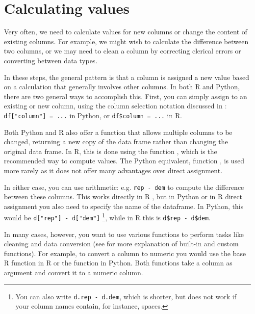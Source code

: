 \section{Calculating values}
\label{sec:calculate}

Very often, we need to calculate values for new columns or change the content of existing columns.
For example, we might wish to calculate the difference between two columns,
or we may need to clean a column by correcting clerical errors or converting between data types.

In these steps, the general pattern is that a column is assigned a new value based on
a calculation that generally involves other columns.
In both R and Python, there are two general ways to accomplish this.
First, you can simply assign to an existing or new column,
using the column selection notation discussed in :
\verb+df["column"] = ...+ in Python, or \verb+df$column = ...+ in R.

Both Python and R also offer a function that allows multiple columns to be changed,
returning a new copy of the data frame rather than changing the original data frame.
In R, this is done using the  function , which is the recommended way to compute values.
The Python equivalent,  function , is used more rarely as it does not offer many advantages over direct assignment.

In either case, you can use arithmetic: e.g. \verb|rep - dem| to compute the difference between these columns.
This works directly in R ,
but in Python or in R direct assignment you also need to specify the name of the dataframe.
In Python, this would be \verb+d["rep"] - d["dem"]+ \footnote{You can also write \texttt{d.rep - d.dem}, which is shorter, but does not work if your column names contain, for instance, spaces.}, while in R this is \verb+d$rep - d$dem+. 

In many cases, however, you want to use various functions to perform tasks like cleaning and data conversion
(see  for more explanation of built-in and custom functions).
For example, to convert a column to numeric you would use the base R function  in R or the  function  in Python.
Both functions take a column as argument and convert it to a numeric column.

